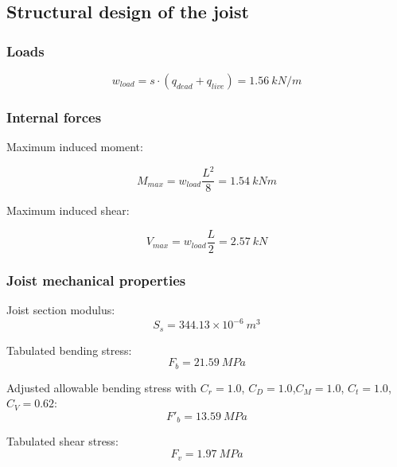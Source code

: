 \documentclass[a4paper,11pt]{xc_memo}
\begin{document}
\subsection{Structural design of the joist}

\subsubsection{Loads}

\begin{equation}
  w_{load}= s \cdot (q_{dead}+q_{live})= 1.56\ kN/m
\end{equation}

\subsubsection{Internal forces}

\noindent Maximum induced moment:

\begin{equation}
  M_{max}= w_{load} \frac{L^2}{8}= 1.54\ kN m
\end{equation}

\noindent Maximum induced shear:

\begin{equation}
  V_{max}= w_{load} \frac{L}{2}= 2.57\ kN
\end{equation}

\subsubsection{Joist mechanical properties}

\noindent Joist section modulus:
\begin{equation}
  S_s= 344.13 \times 10^{-6}\ m^3
\end{equation}

\noindent Tabulated bending stress:
\begin{equation}
  F_b= 21.59\ MPa
\end{equation}


\noindent Adjusted allowable bending stress with $C_r= 1.0$, $C_D= 1.0$,$C_M= 1.0$, $C_t= 1.0$,$C_V= 0.62$:
\begin{equation}
  F'_b= 13.59\ MPa
\end{equation}

\noindent Tabulated shear stress:
\begin{equation}
  F_v= 1.97\ MPa
\end{equation}
\end{document}
